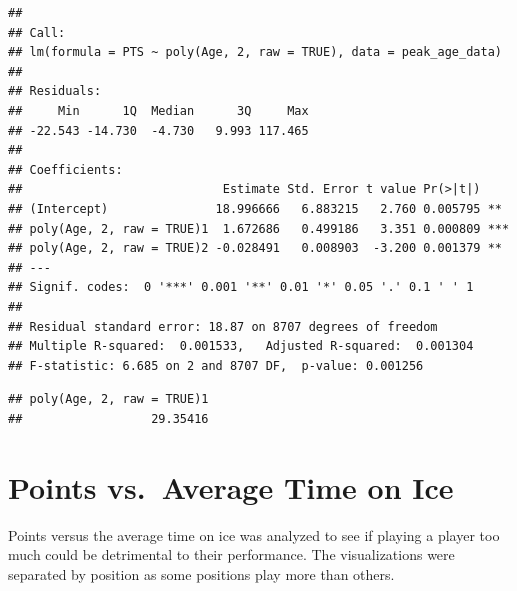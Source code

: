 \documentclass[]{article}
\newenvironment{Shaded}{\begin{snugshade}}{\end{snugshade}}
\newcommand{\CommentTok}[1]{\textcolor[rgb]{0.56,0.35,0.01}{\textit{#1}}}
\newcommand{\DecValTok}[1]{\textcolor[rgb]{0.00,0.00,0.81}{#1}}
\newcommand{\NormalTok}[1]{#1}
\newcommand{\OperatorTok}[1]{\textcolor[rgb]{0.81,0.36,0.00}{\textbf{#1}}}
\newcommand{\StringTok}[1]{\textcolor[rgb]{0.31,0.60,0.02}{#1}}
\begin{document}
\begin{verbatim}
## 
## Call:
## lm(formula = PTS ~ poly(Age, 2, raw = TRUE), data = peak_age_data)
## 
## Residuals:
##     Min      1Q  Median      3Q     Max 
## -22.543 -14.730  -4.730   9.993 117.465 
## 
## Coefficients:
##                            Estimate Std. Error t value Pr(>|t|)    
## (Intercept)               18.996666   6.883215   2.760 0.005795 ** 
## poly(Age, 2, raw = TRUE)1  1.672686   0.499186   3.351 0.000809 ***
## poly(Age, 2, raw = TRUE)2 -0.028491   0.008903  -3.200 0.001379 ** 
## ---
## Signif. codes:  0 '***' 0.001 '**' 0.01 '*' 0.05 '.' 0.1 ' ' 1
## 
## Residual standard error: 18.87 on 8707 degrees of freedom
## Multiple R-squared:  0.001533,   Adjusted R-squared:  0.001304 
## F-statistic: 6.685 on 2 and 8707 DF,  p-value: 0.001256
\end{verbatim}

\begin{Shaded}
\end{Shaded}

\begin{verbatim}
## poly(Age, 2, raw = TRUE)1 
##                  29.35416
\end{verbatim}

\hypertarget{points-vs.-average-time-on-ice}{%
\section{Points vs.~Average Time on
Ice}\label{points-vs.-average-time-on-ice}}

Points versus the average time on ice was analyzed to see if playing a
player too much could be detrimental to their performance. The
visualizations were separated by position as some positions play more
than others.
\end{document}
